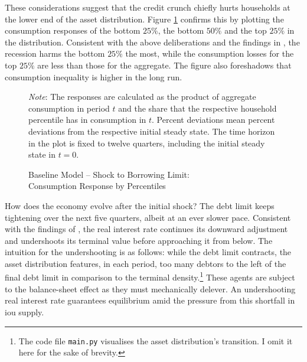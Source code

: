 \documentclass[a4paper,12pt]{article} %
\numberwithin{equation}{section} %
\numberwithin{figure}{section}
\numberwithin{table}{section}
\begin{document}
These considerations suggest that the credit crunch chiefly hurts households at the lower end of the asset distribution. Figure \ref{fig:baseline-permanent-limit-dist-c-response} confirms this by plotting the consumption responses of the bottom $25\%$, the bottom $50\%$ and the top $25\%$ in the distribution. Consistent with the above deliberations and the findings in \textcite{gl2017}, the recession harms the bottom $25\%$ the most, while the consumption losses for the top $25\%$ are less than those for the aggregate. The figure also foreshadows that consumption inequality is higher in the long run.

\begin{figure}[t]
    \centering
    \caption{Baseline Model -- Shock to Borrowing Limit: \\ Consumption Response by Percentiles}
    \label{fig:baseline-permanent-limit-dist-c-response}
    

    \vspace{10pt}
    
    \begin{minipage}{0.75\textwidth} 
    \footnotesize
    \textit{Note}: The responses are calculated as the product of aggregate consumption in period $t$ and the share that the respective household percentile has in consumption in $t$. Percent deviations mean percent deviations from the respective initial steady state. The time horizon in the plot is fixed to twelve quarters, including the initial steady state in $t=0$.
    \end{minipage}
\end{figure}

How does the economy evolve after the initial shock? The debt limit keeps tightening over the next five quarters, albeit at an ever slower pace. Consistent with the findings of \textcite{gl2017}, the real interest rate continues its downward adjustment and undershoots its terminal value before approaching it from below. The intuition for the undershooting is as follows: while the debt limit contracts, the asset distribution features, in each period, too many debtors to the left of the final debt limit in comparison to the terminal density.\footnote{The code file \texttt{main.py} visualises the asset distribution's transition. I omit it here for the sake of brevity.} These agents are subject to the balance-sheet effect as they must mechanically delever. An undershooting real interest rate guarantees equilibrium amid the pressure from this shortfall in \Gls{iou} supply.
\end{document}
